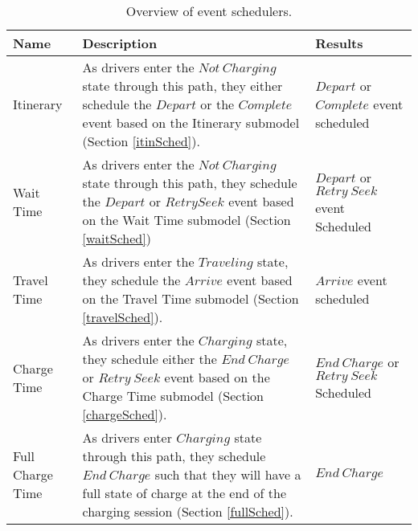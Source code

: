 \documentclass[journal]{IEEEtran}
\begin{document}
\begin{table}[!h]
\def\colmarginA{1cm}
\def\colmarginB{4cm}
\def\colmarginC{2.5cm}
\renewcommand{\arraystretch}{1.3}
\caption{Overview of event schedulers.}
\label{tab:schedulers}
\centering
\begin{tabular}{|lll|}
\hline
Name & Description & Results \\
\hline
\parbox[t]{\colmarginA}{ \raggedright Itinerary} &	\parbox[t]{\colmarginB}{ \raggedright As drivers enter the $Not ~Charging$ state through this path, they either schedule the $Depart$ or the $Complete$ event based on the Itinerary submodel (Section \ref{itinSched}).} & \parbox[t]{\colmarginC}{ \raggedright $Depart$ or $Complete$ event scheduled }\\
\parbox[t]{\colmarginA}{ \raggedright Wait Time}  &	\parbox[t]{\colmarginB}{ \raggedright As drivers enter the $Not ~Charging$ state through this path, they schedule the $Depart$ or $Retry Seek$ event based on the Wait Time submodel (Section \ref{waitSched}) } & \parbox[t]{\colmarginC}{ \raggedright $Depart$ or $Retry ~Seek$ event Scheduled}\\
\parbox[t]{\colmarginA}{ \raggedright Travel Time}  & \parbox[t]{\colmarginB}{ \raggedright As drivers enter the $Traveling$ state, they schedule the $Arrive$ event based on the Travel Time submodel (Section \ref{travelSched}). } & \parbox[t]{\colmarginC}{ \raggedright $Arrive$ event scheduled}\\
\parbox[t]{\colmarginA}{ \raggedright Charge Time}  & \parbox[t]{\colmarginB}{ \raggedright As drivers enter the $Charging$ state, they schedule either the $End ~Charge$ or $Retry ~Seek$ event based on the Charge Time submodel (Section \ref{chargeSched}). } & \parbox[t]{\colmarginC}{ \raggedright $End ~Charge$ or $Retry ~Seek$ Scheduled }\\
\parbox[t]{\colmarginA}{ \raggedright Full Charge Time}  & \parbox[t]{\colmarginB}{ \raggedright As drivers enter $Charging$ state through this path, they schedule $End ~Charge$ such that they will have a full state of charge at the end of the charging session (Section \ref{fullSched}). } & \parbox[t]{\colmarginC}{ \raggedright $End ~Charge$}\\
\hline
\end{tabular}
\end{table}
\end{document}
